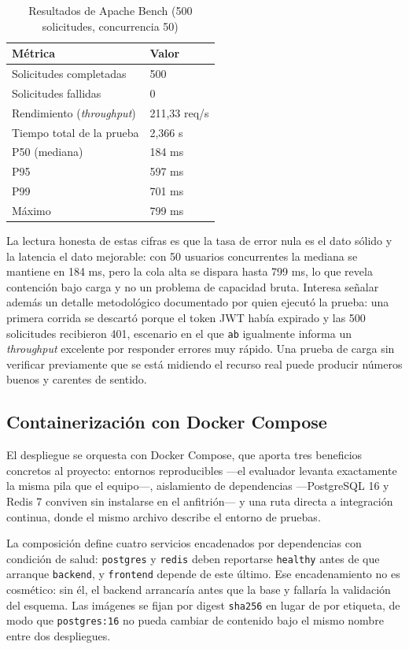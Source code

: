 \documentclass[12pt,a4paper]{article}
\begin{document}
\begin{table}[h!]
  \centering
  \caption{Resultados de Apache Bench (500 solicitudes, concurrencia 50)}
  \label{tab:ab}
  \begin{tabularx}{\linewidth}{@{}L{5.2cm}L{3.4cm}@{}}
    \toprule
    \textbf{Métrica} & \textbf{Valor} \\
    \midrule
    Solicitudes completadas & 500 \\
    Solicitudes fallidas & 0 \\
    Rendimiento (\textit{throughput}) & 211,33 req/s \\
    Tiempo total de la prueba & 2,366 s \\
    P50 (mediana) & 184 ms \\
    P95 & 597 ms \\
    P99 & 701 ms \\
    Máximo & 799 ms \\
    \bottomrule
  \end{tabularx}
\end{table}

La lectura honesta de estas cifras es que la tasa de error nula es el dato sólido y la latencia
el dato mejorable: con 50 usuarios concurrentes la mediana se mantiene en 184 ms, pero la cola
alta se dispara hasta 799 ms, lo que revela contención bajo carga y no un problema de capacidad
bruta. Interesa señalar además un detalle metodológico documentado por quien ejecutó la prueba:
una primera corrida se descartó porque el token JWT había expirado y las 500 solicitudes
recibieron 401, escenario en el que \texttt{ab} igualmente informa un \textit{throughput}
excelente por responder errores muy rápido. Una prueba de carga sin verificar previamente que se
está midiendo el recurso real puede producir números buenos y carentes de sentido.

\subsection{Containerización con Docker Compose}

El despliegue se orquesta con Docker Compose, que aporta tres beneficios concretos al proyecto:
entornos reproducibles ---el evaluador levanta exactamente la misma pila que el equipo---,
aislamiento de dependencias ---PostgreSQL 16 y Redis 7 conviven sin instalarse en el anfitrión---
y una ruta directa a integración continua, donde el mismo archivo describe el entorno de
pruebas.

La composición define cuatro servicios encadenados por dependencias con condición de salud:
\texttt{postgres} y \texttt{redis} deben reportarse \texttt{healthy} antes de que arranque
\texttt{backend}, y \texttt{frontend} depende de este último. Ese encadenamiento no es cosmético:
sin él, el backend arrancaría antes que la base y fallaría la validación del esquema. Las
imágenes se fijan por digest \texttt{sha256} en lugar de por etiqueta, de modo que
\texttt{postgres:16} no pueda cambiar de contenido bajo el mismo nombre entre dos despliegues.
\end{document}
